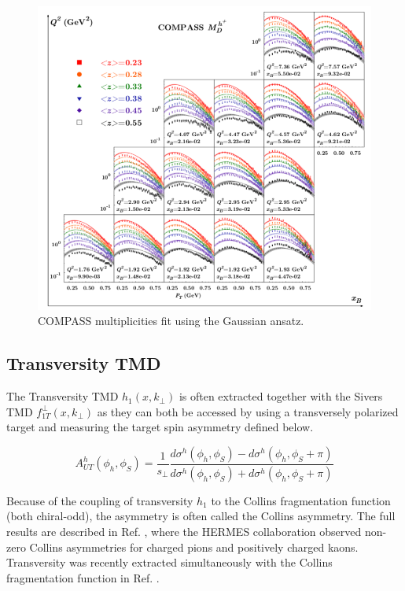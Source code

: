 \begin{figure}
	\centering
	\includegraphics[width=\textwidth]{image/plots/introduction/compass_multi_fit.png}
	\caption{COMPASS multiplicities fit using the Gaussian ansatz.}
	\label{fig:commult}
\end{figure}

\subsection{Transversity TMD}
The Transversity TMD $h_1 (x, k_{\perp})$ is often extracted together with the Sivers TMD $f_{1T}^{\perp} (x, k_{\perp})$ as they can both be accessed by using a transversely polarized target and measuring the target spin asymmetry defined below.

\begin{equation}
	A_{UT}^{h} (\phi_h, \phi_S) = \frac{1}{s_{\perp}} \frac{d\sigma^h (\phi_h, \phi_S) - d\sigma^h (\phi_h, \phi_S + \pi)}{d\sigma^h (\phi_h, \phi_S) + d\sigma^h (\phi_h, \phi_S + \pi)}
\end{equation}

Because of the coupling of transversity $h_1$ to the Collins fragmentation function (both chiral-odd), the asymmetry is often called the Collins asymmetry.  The full results are described in Ref. \cite{tmds-airapetian:2010}, where the HERMES collaboration observed non-zero Collins asymmetries for charged pions and positively charged kaons.  Transversity was recently extracted simultaneously with the Collins fragmentation function in Ref. \cite{tmds-lin:2017}.  

